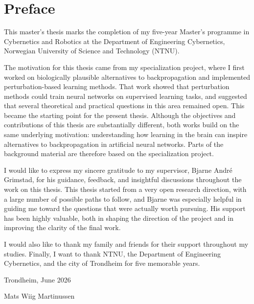 \section*{Preface}

This master’s thesis marks the completion of my five-year Master’s programme in Cybernetics and Robotics at the Department of Engineering Cybernetics, Norwegian University of Science and Technology (NTNU).

The motivation for this thesis came from my specialization project, where I first worked on biologically plausible alternatives to backpropagation and implemented perturbation-based learning methods. That work showed that perturbation methods could train neural networks on supervised learning tasks, and suggested that several theoretical and practical questions in this area remained open. This became the starting point for the present thesis. Although the objectives and contributions of this thesis are substantially different, both works build on the same underlying motivation: understanding how learning in the brain can inspire alternatives to backpropagation in artificial neural networks. Parts of the background material are therefore based on the specialization project.

I would like to express my sincere gratitude to my supervisor, Bjarne André Grimstad, for his guidance, feedback, and insightful discussions throughout the work on this thesis. This thesis started from a very open research direction, with a large number of possible paths to follow, and Bjarne was especially helpful in guiding me toward the questions that were actually worth pursuing. His support has been highly valuable, both in shaping the direction of the project and in improving the clarity of the final work.

I would also like to thank my family and friends for their support throughout my studies. Finally, I want to thank NTNU, the Department of Engineering Cybernetics, and the city of Trondheim for five memorable years.

Trondheim, June 2026

Mats Wiig Martinussen

\clearpage
